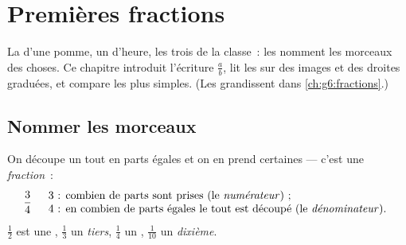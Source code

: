 \chapter{Premières fractions}\label{ch:g4:fractions}

La  d'une pomme, un  d'heure, les trois  de la
classe~: les  nomment les morceaux des choses. Ce chapitre
introduit l'écriture $\frac{a}{b}$, lit les  sur des
images et des droites graduées, et compare les plus simples.
(Les  grandissent dans \cref{ch:g6:fractions}.)

\section{Nommer les morceaux}

\begin{definition}[Fraction]\label{def:g4:fractions:def}
On découpe un tout en parts égales et on en prend certaines --- c'est
une \emph{fraction}~:
\[
\frac{3}{4}
\quad
\begin{array}{l}
3 \text{~: combien de parts sont prises (le \emph{numérateur}\index{numérateur})~;}\\
4 \text{~: en combien de parts égales le tout est découpé (le
\emph{dénominateur}\index{dénominateur}).}
\end{array}
\]
$\frac12$ est une \emph{}, $\frac13$ un \emph{tiers},
$\frac14$ un \emph{}, $\frac{1}{10}$ un \emph{dixième}.
\end{definition}

